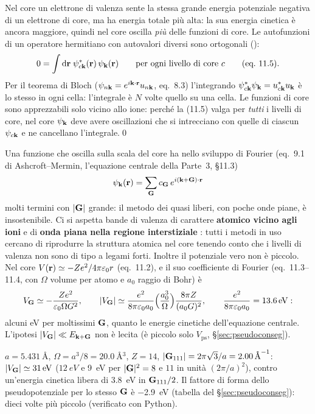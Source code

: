 \documentclass[11pt,a4paper]{article}
\begin{document}
\begin{dimostrazione}
Nel core un elettrone di valenza sente la stessa grande energia potenziale negativa di un elettrone di core, ma ha energia totale più alta: la sua
energia cinetica è ancora maggiore, quindi nel core oscilla \emph{più} delle funzioni di core.
Le autofunzioni di un operatore hermitiano con autovalori diversi sono ortogonali ():
\[
0=\int\mathrm d\mathbf r\;\psi_{c\mathbf k}^*(\mathbf r)\,\psi_{\mathbf k}(\mathbf r)\qquad\text{per ogni livello di core }c\qquad\text{(eq.~11.5)}.
\]
Per il teorema di Bloch ($\psi_{n\mathbf k}=e^{i\mathbf k\cdot\mathbf r}u_{n\mathbf k}$, eq.~8.3) l'integrando $\psi^*_{c\mathbf k}\psi_{\mathbf k}=u^*_{c\mathbf k}u_{\mathbf k}$ è lo stesso in ogni cella:
l'integrale è $N$ volte quello su una cella.
Le funzioni di core sono apprezzabili solo vicino allo ione: perché la (11.5) valga per \emph{tutti} i livelli di core, nel core $\psi_{\mathbf k}$ deve avere
oscillazioni che si intrecciano con quelle di ciascun $\psi_{c\mathbf k}$ e ne cancellano l'integrale.\qed
\end{dimostrazione}

Una funzione che oscilla sulla scala del core ha nello sviluppo di Fourier (eq.~9.1 di Ashcroft--Mermin, l'equazione centrale della Parte~3, §11.3)
\[
\psi_{\mathbf k}(\mathbf r)=\sum_{\mathbf G}c_{\mathbf G}\,e^{i(\mathbf k+\mathbf G)\cdot\mathbf r}
\]
molti termini con $|\mathbf G|$ grande: il metodo dei quasi liberi, con poche onde piane, è insostenibile. Ci si aspetta bande di valenza di carattere
\textbf{atomico vicino agli ioni} e di \textbf{onda piana nella regione interstiziale} : tutti i metodi in uso cercano di
riprodurre la struttura atomica nel core tenendo conto che i livelli di valenza non sono di tipo a legami forti.
Inoltre il potenziale vero non è piccolo. Nel core $V(\mathbf r)\simeq-Ze^2/4\pi\varepsilon_0r$ (eq.~11.2), e il suo coefficiente di Fourier (eq.~11.3--11.4,
con $\Omega$ volume per atomo e $a_0$ raggio di Bohr) è
\[
V_{\mathbf G}\simeq-\frac{Ze^2}{\varepsilon_0\Omega G^2},\qquad
|V_{\mathbf G}|\simeq\frac{e^2}{8\pi\varepsilon_0a_0}\Bigl(\frac{a_0^3}\Omega\Bigr)\frac{8\pi Z}{(a_0G)^2},\qquad\frac{e^2}{8\pi\varepsilon_0a_0}=\SI{13.6}{eV}:
\]
alcuni eV per moltissimi $\mathbf G$, quanto le energie cinetiche dell'equazione centrale. L'ipotesi $|V_{\mathbf G}|\ll E_{\mathbf k+\mathbf G}$ non è lecita
(è piccolo solo $V_{\mathrm{ps}}$, §\ref{sec:pseudoconseg}).
\begin{esempio}[il Si]
$a=\SI{5.431}{\angstrom}$, $\Omega=a^3/8=\SI{20.0}{\angstrom^3}$, $Z=14$, $|\mathbf G_{111}|=2\pi\sqrt3/a=\SI{2.00}{\angstrom^{-1}}$: $|V_{\mathbf G}|\simeq\SI{31}{eV}$
($\SI{12}{eV}$ e \SI{9}{eV} per $|\mathbf G|^2=8$ e $11$ in unità $(2\pi/a)^2$), contro un'energia cinetica libera di \SI{3.8}{eV} in $\mathbf G_{111}/2$.
Il fattore di forma dello pseudopotenziale per lo stesso $\mathbf G$ è \SI{-2.9}{eV} (tabella del §\ref{sec:pseudoconseg}): dieci volte più piccolo
(verificato con Python).
\end{esempio}
\end{document}
